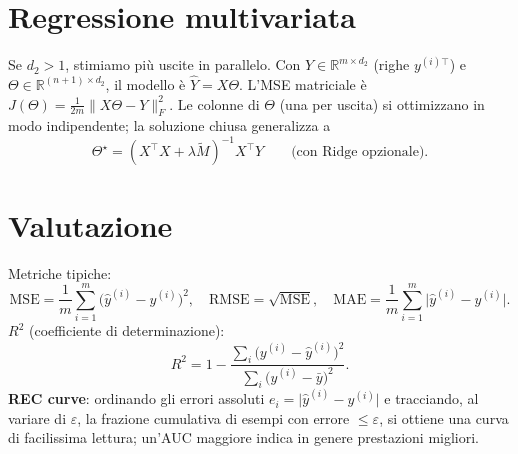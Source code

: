 \section{Regressione multivariata}
Se \(d_2>1\), stimiamo più uscite in parallelo. Con \(Y\in\mathbb{R}^{m\times d_2}\) (righe \(y^{(i)\top}\))
e \(\Theta\in\mathbb{R}^{(n+1)\times d_2}\), il modello è \(\hat{Y}=X\Theta\). L’MSE matriciale è
\(J(\Theta)=\tfrac{1}{2m}\|X\Theta-Y\|_F^2\). Le colonne di \(\Theta\) (una per uscita) si
ottimizzano in modo indipendente; la soluzione chiusa generalizza a
\[
\Theta^\star=(X^\top X+\lambda \tilde M)^{-1}X^\top Y\qquad\text{(con Ridge opzionale)}.
\]

\section{Valutazione}
Metriche tipiche:
\[
\text{MSE}=\frac{1}{m}\sum_{i=1}^m\!\big(\hat y^{(i)}-y^{(i)}\big)^2,\quad
\text{RMSE}=\sqrt{\text{MSE}},\quad
\text{MAE}=\frac{1}{m}\sum_{i=1}^m\!\lvert \hat y^{(i)}-y^{(i)}\rvert.
\]
\noindent
\textbf{\(R^2\)} (coefficiente di determinazione):
\[
R^2=1-\frac{\sum_i\big(y^{(i)}-\hat{y}^{(i)}\big)^2}{\sum_i\big(y^{(i)}-\bar{y}\big)^2}.
\]
\textbf{REC curve}: ordinando gli errori assoluti \(e_i=\lvert \hat y^{(i)}-y^{(i)}\rvert\) e
tracciando, al variare di \(\varepsilon\), la frazione cumulativa di esempi con errore
\(\le\varepsilon\), si ottiene una curva di facilissima lettura; un’AUC maggiore indica in
genere prestazioni migliori.